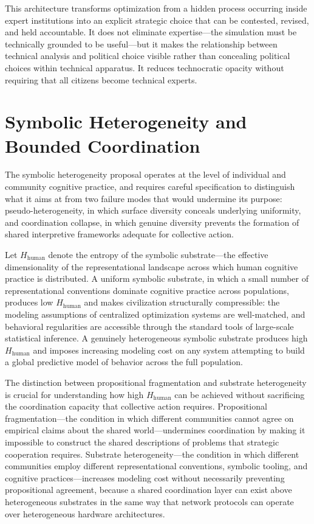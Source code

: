 \documentclass[12pt]{article}
\begin{document}
This architecture transforms optimization from a hidden process occurring inside expert institutions into an explicit strategic choice that can be contested, revised, and held accountable. It does not eliminate expertise---the simulation must be technically grounded to be useful---but it makes the relationship between technical analysis and political choice visible rather than concealing political choices within technical apparatus. It reduces technocratic opacity without requiring that all citizens become technical experts.

\section{Symbolic Heterogeneity and Bounded Coordination}

The symbolic heterogeneity proposal operates at the level of individual and community cognitive practice, and requires careful specification to distinguish what it aims at from two failure modes that would undermine its purpose: pseudo-heterogeneity, in which surface diversity conceals underlying uniformity, and coordination collapse, in which genuine diversity prevents the formation of shared interpretive frameworks adequate for collective action.

Let $H_{\text{human}}$ denote the entropy of the symbolic substrate---the effective dimensionality of the representational landscape across which human cognitive practice is distributed. A uniform symbolic substrate, in which a small number of representational conventions dominate cognitive practice across populations, produces low $H_{\text{human}}$ and makes civilization structurally compressible: the modeling assumptions of centralized optimization systems are well-matched, and behavioral regularities are accessible through the standard tools of large-scale statistical inference. A genuinely heterogeneous symbolic substrate produces high $H_{\text{human}}$ and imposes increasing modeling cost on any system attempting to build a global predictive model of behavior across the full population.

The distinction between propositional fragmentation and substrate heterogeneity is crucial for understanding how high $H_{\text{human}}$ can be achieved without sacrificing the coordination capacity that collective action requires. Propositional fragmentation---the condition in which different communities cannot agree on empirical claims about the shared world---undermines coordination by making it impossible to construct the shared descriptions of problems that strategic cooperation requires. Substrate heterogeneity---the condition in which different communities employ different representational conventions, symbolic tooling, and cognitive practices---increases modeling cost without necessarily preventing propositional agreement, because a shared coordination layer can exist above heterogeneous substrates in the same way that network protocols can operate over heterogeneous hardware architectures.
\end{document}
